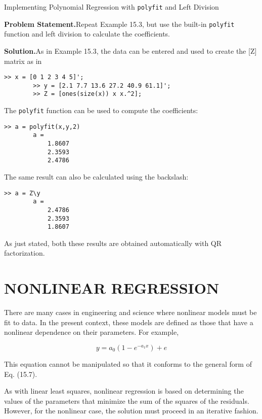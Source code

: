 \documentclass[../main.tex]{subfiles}
\begin{document}
\begin{example} Implementing Polynomial Regression with \texttt{polyfit} and Left Division

    \textbf{Problem Statement.}\quad Repeat Example 15.3, but use the built-in \texttt{polyfit} function and
	left division to calculate the coefficients.

	\noindent\textbf{Solution.}\quad As in Example 15.3, the data can be entered and used to create the [Z] matrix
	as in

	\begin{lstlisting}[numbers=none]
		>> x = [0 1 2 3 4 5]';
		>> y = [2.1 7.7 13.6 27.2 40.9 61.1]';
		>> Z = [ones(size(x)) x x.^2];
	\end{lstlisting}

	\noindent The \texttt{polyfit} function can be used to compute the coefficients:

	\begin{lstlisting}[numbers=none]
		>> a = polyfit(x,y,2)
		a =
			1.8607
			2.3593
			2.4786
	\end{lstlisting}

	The same result can also be calculated using the backslash:

	\begin{lstlisting}[numbers=none]
		>> a = Z\y
		a =
			2.4786
			2.3593
			1.8607	
	\end{lstlisting}

	\noindent As just stated, both these results are obtained automatically with QR factorization.
\end{example}

\bigskip
\label{cha:cha_P_15_5} %
\section{NONLINEAR REGRESSION}

\noindent There are many cases in engineering and science where nonlinear models must be fit to
data. In the present context, these models are defined as those that have a nonlinear dependence on their parameters. For example,

\begin{equation}
	\tag{15.12}
	y = a_0 (1 - e^{-a_1 x}) + e
\end{equation}

\noindent This equation cannot be manipulated so that it conforms to the general form of Eq. (15.7).

As with linear least squares, nonlinear regression is based on determining the values
of the parameters that minimize the sum of the squares of the residuals. However, for the
nonlinear case, the solution must proceed in an iterative fashion.
\end{document}
